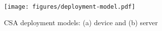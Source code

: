 \begin{figure}[t]
	\centering
	\texttt{[image: figures/deployment-model.pdf]}
    \vspace{-1mm}
	\caption{\small CSA deployment models: (a) device and (b) server}
	\label{fig:secndp-arch_designs}
	\vspace{-2mm}
\end{figure}